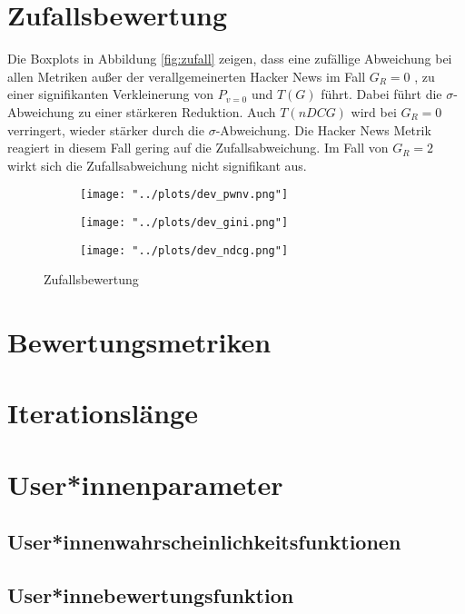 \section{Zufallsbewertung}


Die Boxplots in Abbildung \ref{fig:zufall} zeigen, dass eine zufällige Abweichung bei allen Metriken außer der verallgemeinerten Hacker News im Fall $G_R = 0$ , zu einer signifikanten Verkleinerung von $P_{v=0}$ und $T(G)$ führt. Dabei führt die $\sigma$-Abweichung zu einer stärkeren Reduktion. Auch $T(nDCG)$ wird bei $G_R = 0$ verringert, wieder stärker durch die $\sigma$-Abweichung. Die Hacker News Metrik reagiert in diesem Fall gering auf die Zufallsabweichung. Im Fall von $G_R = 2$ wirkt sich die Zufallsabweichung nicht signifikant aus.

\begin{figure}[!h]
	\label{fig:zufall}	
	\begin{subfigure}{0.5\textwidth}
		\texttt{[image: "../plots/dev\_pwnv.png"]}
	\end{subfigure}
	\begin{subfigure}{0.5\textwidth}
		\texttt{[image: "../plots/dev\_gini.png"]}
	\end{subfigure}
	\begin{subfigure}{0.5\textwidth}
		\texttt{[image: "../plots/dev\_ndcg.png"]}
	\end{subfigure}
	\caption{Zufallsbewertung}
\end{figure}

\section{Bewertungsmetriken}


\section{Iterationslänge}

\section{User*innenparameter}

\subsection{User*innenwahrscheinlichkeitsfunktionen}

\subsection{User*innebewertungsfunktion}


